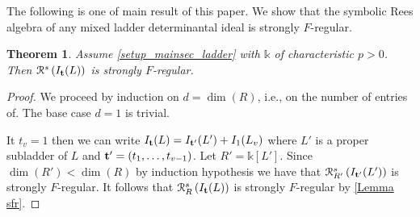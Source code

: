 \documentclass[12pt]{amsart}
\newtheorem{theorem}{Theorem}[section]
\theoremstyle{definition}
\newcommand{\R}[1]{R^{1/p^{#1}}}
\renewcommand{\(}{\left(}
\renewcommand{\)}{\right)}
\newcommand{\cR}{\mathcal{R}}
\def \R{\mathcal R}
\renewcommand{\!}[1]{{\color{red}\text{\Huge$\star$ }#1}}
\newcommand{\ttt}{{\bf t}}
\begin{document}
The following is one of main result of this paper. We show that the symbolic Rees algebra of any mixed ladder determinantal ideal is strongly $F$-regular. 

\begin{theorem}\label{stronglyF}
Assume \autoref{setup_mainsec_ladder} with   $\mathbb{k}$ of characteristic $p>0$. Then  $\R^s\left(I_{\ttt}(L)\right)$ is strongly $F$-regular.
\end{theorem}
\begin{proof}

We proceed by induction on $d=\dim(R)$, i.e., on the number of entries of. The base case $d=1$ is trivial.

It $t_v=1$ then we can write $I_{\ttt}(L)=I_{\ttt'}(L') + I_1(L_v)$ where $L'$ is a proper subladder of $L$ and $\ttt' = (t_1,\ldots,t_{v-1})$. %
Let $R' = \mathbb{k}[L']$. Since $\dim(R')<\dim(R)$ by induction hypothesis  we have that $\cR^s_{R'}\left(I_{\ttt'}(L')\right)$ is strongly $F$-regular. It follows that $\cR^s_R\left(I_{\ttt}(L)\right)$ is strongly $F$-regular by \autoref{Lemma sfr}.


\end{proof}
\end{document}
